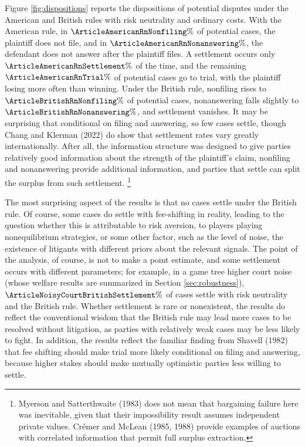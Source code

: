 \documentclass{article}
\begin{document}
Figure \ref{fig:dispositions} reports the dispositions of potential disputes under the American and British rules with risk neutrality and ordinary costs. With the American rule, in $\ArticleAmericanRnNonfiling\%$ of potential cases, the plaintiff does not file, and in $\ArticleAmericanRnNonanswering\%$, the defendant does not answer after the plaintiff files. A settlement occurs only $\ArticleAmericanRnSettlement\%$ of the time, and the remaining $\ArticleAmericanRnTrial\%$ of potential cases go to trial, with the plaintiff losing more often than winning. Under the British rule, nonfiling rises to $\ArticleBritishRnNonfiling\%$ of potential cases, nonanswering falls slightly to $\ArticleBritishRnNonanswering\%$, and settlement vanishes. It may be surprising that conditional on filing and answering, so few cases settle, though Chang and Klerman (2022) \cite{changklerman} do show that settlement rates vary greatly internationally.  After all, the information structure was designed to give parties relatively good information about the strength of the plaintiff's claim, nonfiling and nonanswering provide additional information, and parties that settle can split the surplus from such settlement. \footnote{Myerson and Satterthwaite (1983) \cite{myersonsatterthwaite} does not mean that bargaining failure here was inevitable, given that their impossibility result assumes independent private values. Crémer and McLean (1985, 1988) \cite{cremermclean1985,cremermclean1988} provide examples of auctions with correlated information that permit full surplus extraction.}

The most surprising aspect of the results is that no cases settle under the British rule. Of course, some cases do settle with fee-shifting in reality, leading to the question whether this is attributable to risk aversion, to players playing nonequilibrium strategies, or some other factor, such as the level of noise, the existence of litigants with different priors about the relevant signals. The point of the analysis, of course, is not to make a point estimate, and some settlement occurs with different parameters; for example,  in a game tree higher court noise (whose welfare results are summarized in Section \ref{sec:robustness}), $\ArticleNoisyCourtBritishSettlement\%$ of cases settle with risk neutrality and the British rule. Whether settlement is rare or nonexistent, the results do reflect the conventional wisdom that the British rule may lead more cases to be resolved without litigation, as parties with relatively weak cases may be less likely to fight.  In addition, the results reflect the familiar finding from Shavell (1982) \cite[65--66]{shavell} that fee shifting should make trial more likely conditional on filing and answering, because higher stakes should make mutually optimistic parties less willing to settle.
\end{document}
